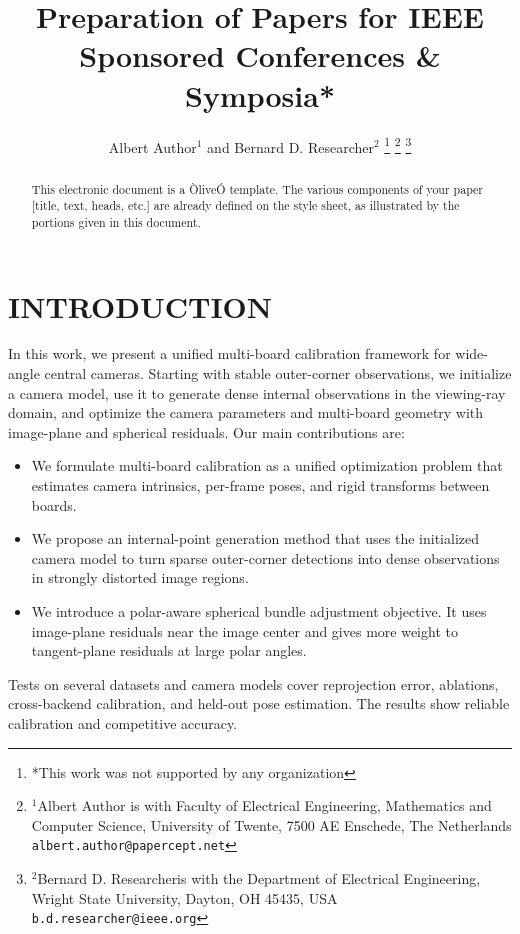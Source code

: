 \documentclass[letterpaper, 10 pt, conference]{ieeeconf}  %
\title{\LARGE \bf
Preparation of Papers for IEEE Sponsored Conferences \& Symposia*
}
\author{Albert Author$^{1}$ and Bernard D. Researcher$^{2}$%
\thanks{*This work was not supported by any organization}%
\thanks{$^{1}$Albert Author is with Faculty of Electrical Engineering, Mathematics and Computer Science,
        University of Twente, 7500 AE Enschede, The Netherlands
        {\tt\small albert.author@papercept.net}}%
\thanks{$^{2}$Bernard D. Researcheris with the Department of Electrical Engineering, Wright State University,
        Dayton, OH 45435, USA
        {\tt\small b.d.researcher@ieee.org}}%
}
\begin{document}
\maketitle
\thispagestyle{empty}
\pagestyle{empty}


\begin{abstract}

This electronic document is a ÒliveÓ template. The various components of your paper [title, text, heads, etc.] are already defined on the style sheet, as illustrated by the portions given in this document.

\end{abstract}


\section{INTRODUCTION}

In this work, we present a unified multi-board calibration framework for
wide-angle central cameras. Starting with stable outer-corner observations, we
initialize a camera model, use it to generate dense internal observations in
the viewing-ray domain, and optimize the camera parameters and multi-board
geometry with image-plane and spherical residuals. Our main contributions are:

\begin{itemize}
\setlength{\itemsep}{1pt}
\setlength{\parskip}{0pt}
\setlength{\parsep}{0pt}
\item We formulate multi-board calibration as a unified optimization problem 
that estimates camera intrinsics, per-frame poses, and rigid transforms between boards.
\item We propose an internal-point generation method that uses the initialized
camera model to turn sparse outer-corner detections into dense observations in
strongly distorted image regions.
\item We introduce a polar-aware spherical bundle adjustment objective. It uses
image-plane residuals near the image center and gives more weight to
tangent-plane residuals at large polar angles.
\end{itemize}

Tests on several datasets and camera models cover reprojection error, ablations,
cross-backend calibration, and held-out pose estimation. The results show
reliable calibration and competitive accuracy.
\end{document}
